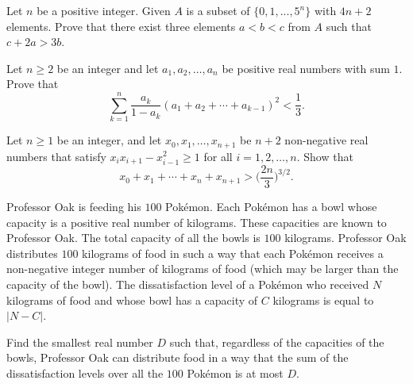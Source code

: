 \documentclass[11pt]{scrartcl}
\begin{document}
\begin{Problem}
Let $n$ be a positive integer. Given $A$ is a subset of $\{0,1,...,5^n\}$ with $4n+2$ elements. Prove that there exist three elements $a<b<c$ from $A$ such that $c+2a>3b$.
\end{Problem}







\begin{Problem}
Let $n\geq 2$ be an integer and let $a_1, a_2, \ldots, a_n$ be positive real numbers with sum $1$. Prove that$$\sum_{k=1}^n \frac{a_k}{1-a_k}(a_1+a_2+\cdots+a_{k-1})^2 < \frac{1}{3}.$$
\end{Problem}


\begin{Problem}
Let $n\geqslant 1$ be an integer, and let $x_0,x_1,\ldots,x_{n+1}$ be $n+2$ non-negative real numbers that satisfy $x_ix_{i+1}-x_{i-1}^2\geqslant 1$ for all $i=1,2,\ldots,n.$ Show that\[x_0+x_1+\cdots+x_n+x_{n+1}>\bigg(\frac{2n}{3}\bigg)^{3/2}.\]
\end{Problem}









\begin{Problem}
Professor Oak is feeding his $100$ Pokémon. Each Pokémon has a bowl whose capacity is a positive real number of kilograms. These capacities are known to Professor Oak. The total capacity of all the bowls is $100$ kilograms. Professor Oak distributes $100$ kilograms of food in such a way that each Pokémon receives a non-negative integer number of kilograms of food (which may be larger than the capacity of the bowl). The dissatisfaction level of a Pokémon who received $N$ kilograms of food and whose bowl has a capacity of $C$ kilograms is equal to $\lvert N-C\rvert$.

Find the smallest real number $D$ such that, regardless of the capacities of the bowls, Professor Oak can distribute food in a way that the sum of the dissatisfaction levels over all the $100$ Pokémon is at most $D$.
\end{Problem}
\end{document}
